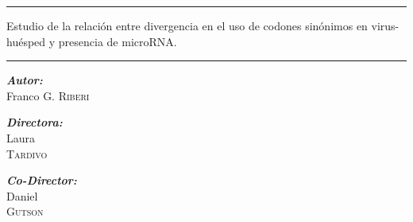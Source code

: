 \documentclass[12pt,a4paper]{report}
\newcommand{\HRule}{\rule{\linewidth}{0.5mm}}
\begin{document}
\noindent \HRule 
\begin{center} \large Estudio de la relación entre divergencia en el uso de codones sinónimos en virus-huésped y presencia de microRNA. \end{center} 

\HRule 
\vskip 2.5cm

\begin{center} 
\large \textbf{\emph{Autor:}}\\
\large Franco G. \textsc{Riberi}
\end{center}
\vskip 1.5cm

\begin{minipage}{0.35\textwidth}
\begin{center} 
\hspace*{1cm} \textbf{\emph{Directora:}}\\
\hspace*{1cm} Laura \\ \hspace*{1cm} \textsc{Tardivo}
\end{center} 
\end{minipage}
\begin{minipage}{0.55\textwidth}
\begin{center} 
\textbf{\emph{Co-Director:}} \\
Daniel \\ \textsc{Gutson}
\end{center}
\end{minipage}


\newpage
\thispagestyle{empty}


\newpage
\thispagestyle{empty}


\tableofcontents

\newpage
\listoffigures

\fancyhead{} 
\fancyhead[L]{\bfseries\rightmark}
\fancyfoot{} 
\fancyfoot[LE,RO]{\bfseries \thepage}
\renewcommand{\headrulewidth}{0.4pt}
\renewcommand{\footrulewidth}{0.4pt}
\pagestyle{fancy} 
\end{document}
